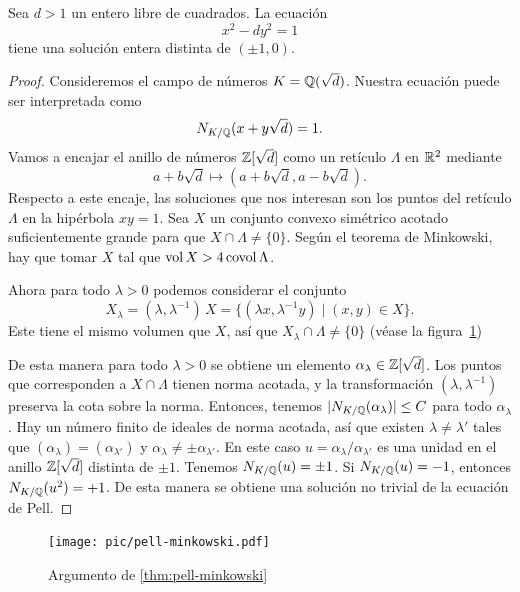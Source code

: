 \begin{teorema}
  \label{thm:pell-minkowski}
  Sea $d > 1$ un entero libre de cuadrados. La ecuación
  $$x^2 - dy^2 = 1$$
  tiene una solución entera distinta de $(\pm 1, 0)$.

  \begin{proof}
    Consideremos el campo de números $K = \mathbb{Q} (\sqrt{d})$. Nuestra ecuación
    puede ser interpretada como
    $$N_{K/\mathbb{Q}} (x + y\sqrt{d}) = 1.$$
    Vamos a encajar el anillo de números $\mathbb{Z} [\sqrt{d}]$ como un retículo
    $\Lambda$ en $\mathbb{R}^2$ mediante
    $$a + b\sqrt{d} \mapsto (a + b\sqrt{d}, a - b\sqrt{d}).$$
    Respecto a este encaje, las soluciones que nos interesan son los puntos
    del retículo $\Lambda$ en la hipérbola $xy = 1$. Sea $X$ un conjunto
    convexo simétrico acotado suficientemente grande para que
    $X \cap \Lambda \ne \{ 0 \}$. Según el teorema de Minkowski, hay que
    tomar $X$ tal que $\operatorname{vol} X > 4 \operatorname{covol} \Lambda$.

    Ahora para todo $\lambda > 0$ podemos considerar el conjunto
    $$X_\lambda = (\lambda, \lambda^{-1})\,X = \{ (\lambda x, \lambda^{-1} y) \mid (x,y) \in X \}.$$
    Este tiene el mismo volumen que $X$, así que
    $X_\lambda \cap \Lambda \ne \{ 0 \}$ (véase la
    figura~\ref{fig:pell-minkowski})

    De esta manera para todo $\lambda > 0$ se obtiene un elemento
    $\alpha_\lambda \in \mathbb{Z} [\sqrt{d}]$. Los puntos que corresponden a
    $X \cap \Lambda$ tienen norma acotada, y la transformación
    $(\lambda, \lambda^{-1})$ preserva la cota sobre la norma. Entonces,
    tenemos $|N_{K/\mathbb{Q}} (\alpha_\lambda)| \le C$ para todo $\alpha_\lambda$.
    Hay un número finito de ideales de norma acotada, así que existen
    $\lambda \ne \lambda'$ tales que $(\alpha_\lambda) = (\alpha_{\lambda'})$
    y $\alpha_\lambda \ne \pm\alpha_{\lambda'}$. En este caso
    $u = \alpha_\lambda/\alpha_{\lambda'}$ es una unidad en el anillo
    $\mathbb{Z} [\sqrt{d}]$ distinta de $\pm 1$. Tenemos $N_{K/\mathbb{Q}} (u) = \pm 1$.
    Si $N_{K/\mathbb{Q}} (u) = -1$, entonces $N_{K/\mathbb{Q}} (u^2) = +1$. De esta manera
    se obtiene una solución no trivial de la ecuación de Pell.
  \end{proof}
\end{teorema}

\begin{figure}
  \begin{center}
    \texttt{[image: pic/pell-minkowski.pdf]}
  \end{center}

  \caption{Argumento de \ref{thm:pell-minkowski}}
  \label{fig:pell-minkowski}
\end{figure}

